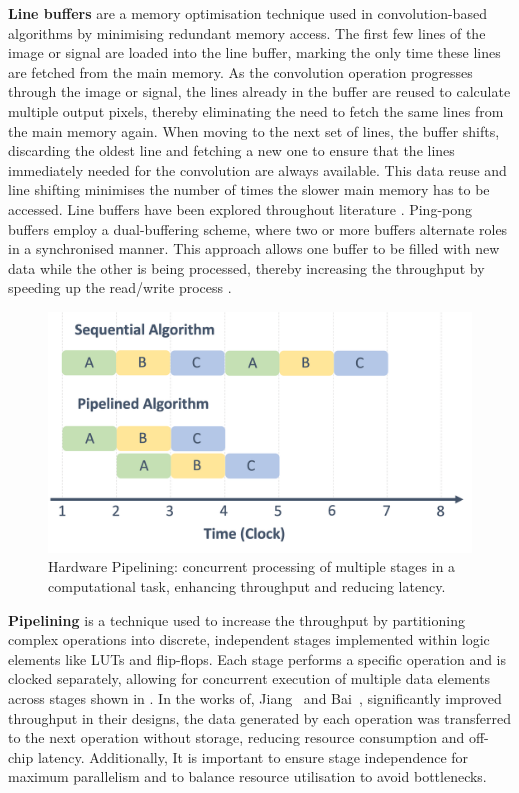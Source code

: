 \textbf{Line buffers} are a memory optimisation technique used in convolution-based algorithms by minimising redundant memory access. The first few lines of the image or signal are loaded into the line buffer, marking the only time these lines are fetched from the main memory. As the convolution operation progresses through the image or signal, the lines already in the buffer are reused to calculate multiple output pixels, thereby eliminating the need to fetch the same lines from the main memory again. When moving to the next set of lines, the buffer shifts, discarding the oldest line and fetching a new one to ensure that the lines immediately needed for the convolution are always available. This data reuse and line shifting minimises the number of times the slower main memory has to be accessed. Line buffers have been explored throughout literature \cite{SonLeeKo14,FanZhaYan17,ZhaXiaHu07,AsaMaeYam09}. Ping-pong buffers employ a dual-buffering scheme, where two or more buffers alternate roles in a synchronised manner. This approach allows one buffer to be filled with new data while the other is being processed, thereby increasing the throughput by speeding up the read/write process \cite{JiaXiaZha14,BaiZhaHua18,liuzoudan19}.

\begin{figure}[tb]
\centering
\includegraphics[width=\linewidth]{Images/Pipelining.png}
\caption[Hardware Pipelining Optimisation]{Hardware Pipelining: concurrent processing of multiple stages in a computational task, enhancing throughput and reducing latency.}
\label{fig:pipelining}
\end{figure}

\textbf{Pipelining} is a technique used to increase the throughput by partitioning complex operations into discrete, independent stages implemented within logic elements like LUTs and flip-flops. Each stage performs a specific operation and is clocked separately, allowing for concurrent execution of multiple data elements across stages shown in . In the works of, Jiang~\etal\cite{JiaXiaZha14} and Bai~\etal\cite{BaiZhaHua18}, significantly improved throughput in their designs, the data generated by each operation was transferred to the next operation without storage, reducing resource consumption and off-chip latency. Additionally, It is important to ensure stage independence for maximum parallelism and to balance resource utilisation to avoid bottlenecks.

